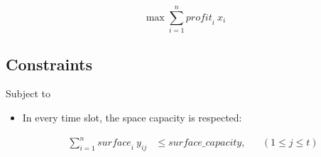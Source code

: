 \documentclass{article}
\begin{document}
\begin{equation*}
  \max \sum^n_{i = 1} \mathit{profit}_i \: x_i
\end{equation*}

\subsection{Constraints}

Subject to

\begin{itemize}
    \item In every time slot, the space capacity is respected:
    
    \begin{align}
        \sum^n_{i=1}\mathit{surface}_i \: y_{ij} &\leq \mathit{surface\_capacity}, &&(1 \leq j \leq t)
    \end{align}
    

\end{itemize}
\end{document}
